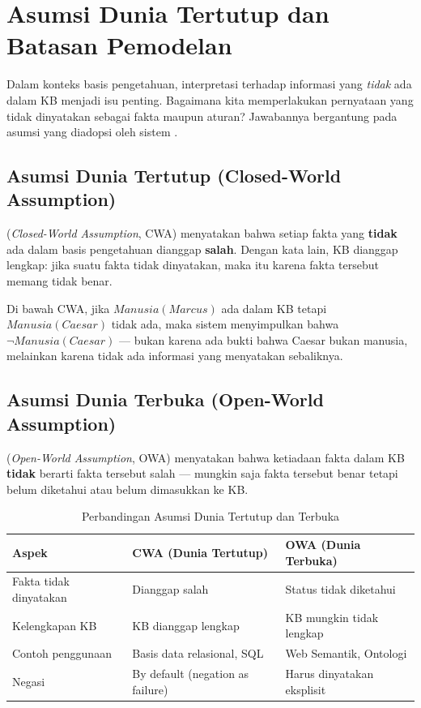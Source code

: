 \section{Asumsi Dunia Tertutup dan Batasan Pemodelan}

Dalam konteks basis pengetahuan, interpretasi terhadap informasi yang \emph{tidak} ada dalam KB menjadi isu penting. Bagaimana kita memperlakukan pernyataan yang tidak dinyatakan sebagai fakta maupun aturan? Jawabannya bergantung pada asumsi yang diadopsi oleh sistem \cite{rosen2019}.

\subsection{Asumsi Dunia Tertutup (Closed-World Assumption)}

\begin{definisi}
 (\textit{Closed-World Assumption}, CWA) menyatakan bahwa setiap fakta yang \textbf{tidak} ada dalam basis pengetahuan dianggap \textbf{salah}. Dengan kata lain, KB dianggap lengkap: jika suatu fakta tidak dinyatakan, maka itu karena fakta tersebut memang tidak benar.
\end{definisi}

Di bawah CWA, jika $Manusia(Marcus)$ ada dalam KB tetapi $Manusia(Caesar)$ tidak ada, maka sistem menyimpulkan bahwa $\neg Manusia(Caesar)$ --- bukan karena ada bukti bahwa Caesar bukan manusia, melainkan karena tidak ada informasi yang menyatakan sebaliknya.

\subsection{Asumsi Dunia Terbuka (Open-World Assumption)}

\begin{definisi}
 (\textit{Open-World Assumption}, OWA) menyatakan bahwa ketiadaan fakta dalam KB \textbf{tidak} berarti fakta tersebut salah --- mungkin saja fakta tersebut benar tetapi belum diketahui atau belum dimasukkan ke KB.
\end{definisi}

\begin{table}[htbp]
\centering
\renewcommand{\arraystretch}{1.3}
\begin{tabular}{|p{3.5cm}|p{4cm}|p{4.5cm}|}
\hline
\textbf{Aspek} & \textbf{CWA (Dunia Tertutup)} & \textbf{OWA (Dunia Terbuka)} \\ \hline
Fakta tidak dinyatakan & Dianggap salah & Status tidak diketahui \\ \hline
Kelengkapan KB & KB dianggap lengkap & KB mungkin tidak lengkap \\ \hline
Contoh penggunaan & Basis data relasional, SQL & Web Semantik, Ontologi \\ \hline
Negasi & By default (negation as failure) & Harus dinyatakan eksplisit \\ \hline
\end{tabular}
\caption{Perbandingan Asumsi Dunia Tertutup dan Terbuka}
\end{table}

